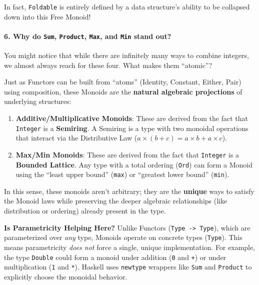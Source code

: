 \documentclass[
]{article}
\providecommand{\tightlist}{%
  \setlength{\itemsep}{0pt}\setlength{\parskip}{0pt}}
\begin{document}
In fact, \texttt{Foldable} is entirely defined by a data structure's
ability to be collapsed down into this Free Monoid!

\paragraph{\texorpdfstring{6. Why do \texttt{Sum}, \texttt{Product},
\texttt{Max}, and \texttt{Min} stand
out?}{6. Why do Sum, Product, Max, and Min stand out?}}\label{why-do-sum-product-max-and-min-stand-out}

You might notice that while there are infinitely many ways to combine
integers, we almost always reach for these four. What makes them
``atomic''?

Just as Functors can be built from ``atoms'' (Identity, Constant,
Either, Pair) using composition, these Monoids are the \textbf{natural
algebraic projections} of underlying structures:

\begin{enumerate}
\def\labelenumi{\arabic{enumi}.}
\tightlist
\item
  \textbf{Additive/Multiplicative Monoids}: These are derived from the
  fact that \texttt{Integer} is a \textbf{Semiring}. A Semiring is a
  type with two monoidal operations that interact via the Distributive
  Law (\(a \times (b + c) = a \times b + a \times c\)).
\item
  \textbf{Max/Min Monoids}: These are derived from the fact that
  \texttt{Integer} is a \textbf{Bounded Lattice}. Any type with a total
  ordering (\texttt{Ord}) can form a Monoid using the ``least upper
  bound'' (\texttt{max}) or ``greatest lower bound'' (\texttt{min}).
\end{enumerate}

In this sense, these monoids aren't arbitrary; they are the
\textbf{unique} ways to satisfy the Monoid laws while preserving the
deeper algebraic relationships (like distribution or ordering) already
present in the type.

\textbf{Is Parametricity Helping Here?} Unlike Functors
(\texttt{Type\ -\textgreater{}\ Type}), which are parameterized over
\emph{any} type, Monoids operate on concrete types (\texttt{Type}). This
means parametricity \emph{does not} force a single, unique
implementation. For example, the type \texttt{Double} could form a
monoid under addition (\texttt{0} and \texttt{+}) or under
multiplication (\texttt{1} and \texttt{*}). Haskell uses
\texttt{newtype} wrappers like \texttt{Sum} and \texttt{Product} to
explicitly choose the monoidal behavior.
\end{document}
